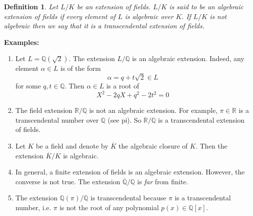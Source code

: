 \documentclass[12pt]{article}
\newtheorem{defn}{Definition}
\newcommand{\Reals}{\mathbb{R}}
\newcommand{\Rats}{\mathbb{Q}}
\begin{document}
\begin{defn}
Let $L/K$ be an extension of fields. $L/K$ is said to be an
\emph{algebraic extension} of fields if every element of $L$ is
algebraic over $K$. If $L/K$ is not algebraic then we say that it is a transcendental extension of fields.
\end{defn}

{\bf Examples: }
\begin{enumerate}
\item Let $L=\Rats(\sqrt{2})$. The extension $L/\Rats$ is an
algebraic extension. Indeed, any element $\alpha\in L$ is of the
form
$$\alpha=q+t\sqrt{2}\in L$$
for some $q,t\in\Rats$. Then $\alpha\in L$ is a root of
$$X^2-2qX+q^2-2t^2=0$$

\item The field extension $\Reals/ \Rats$ is not an algebraic
extension. For example, $\pi\in \Reals$ is a transcendental number
over $\Rats$ (see pi). So $\Reals/\Rats$ is a transcendental extension of fields.

\item Let $K$ be a field and denote by $\overline{K}$ the
algebraic closure of $K$. Then the extension $\overline{K}/K$ is
algebraic.

\item In general, a finite extension of fields is an algebraic
extension. However, the converse is not true. The extension
$\overline{\Rats}/\Rats$ is \emph{far} from finite.

\item The extension $\Rats(\pi)/\Rats$ is transcendental because $\pi$ is a transcendental number, i.e. $\pi$ is not the root of any polynomial $p(x)\in \Rats[x]$.
\end{enumerate}


\end{document}
